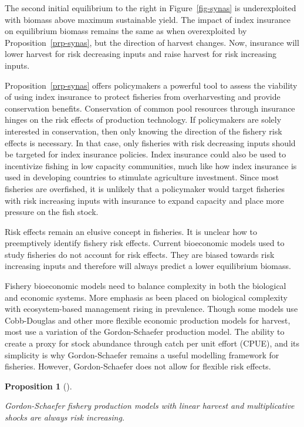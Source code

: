 \documentclass[
  super,
  preprint,
  3p]{elsarticle}
\theoremstyle{plain}
\newtheorem{proposition}{Proposition}[section]
\theoremstyle{plain}
\theoremstyle{remark}
\begin{document}
The second initial equilibrium to the right in Figure~\ref{fig-synas} is
underexploited with biomass above maximum sustainable yield. The impact
of index insurance on equilibrium biomass remains the same as when
overexploited by Proposition~\ref{prp-synas}, but the direction of
harvest changes. Now, insurance will lower harvest for risk decreasing
inputs and raise harvest for risk increasing inputs.

Proposition~\ref{prp-synas} offers policymakers a powerful tool to
assess the viability of using index insurance to protect fisheries from
overharvesting and provide conservation benefits. Conservation of common
pool resources through insurance hinges on the risk effects of
production technology. If policymakers are solely interested in
conservation, then only knowing the direction of the fishery risk
effects is necessary. In that case, only fisheries with risk decreasing
inputs should be targeted for index insurance policies. Index insurance
could also be used to incentivize fishing in low capacity communities,
much like how index insurance is used in developing countries to
stimulate agriculture investment. Since most fisheries are overfished,
it is unlikely that a policymaker would target fisheries with risk
increasing inputs with insurance to expand capacity and place more
pressure on the fish stock.

Risk effects remain an elusive concept in fisheries. It is unclear how
to preemptively identify fishery risk effects. Current bioeconomic
models used to study fisheries do not account for risk effects. They are
biased towards risk increasing inputs and therefore will always predict
a lower equilibrium biomass.

Fishery bioeconomic models need to balance complexity in both the
biological and economic systems. More emphasis as been placed on
biological complexity with ecosystem-based management rising in
prevalence. Though some models use Cobb-Douglas and other more flexible
economic production models for harvest, most use a variation of the
Gordon-Schaefer production model. The ability to create a proxy for
stock abundance through catch per unit effort (CPUE), and its simplicity
is why Gordon-Schaefer remains a useful modelling framework for
fisheries. However, Gordon-Schaefer does not allow for flexible risk
effects.

\begin{proposition}[]\protect\hypertarget{prp-gs}{}\label{prp-gs}

Gordon-Schaefer fishery production models with linear harvest and
multiplicative shocks are always risk increasing.

\end{proposition}
\end{document}
